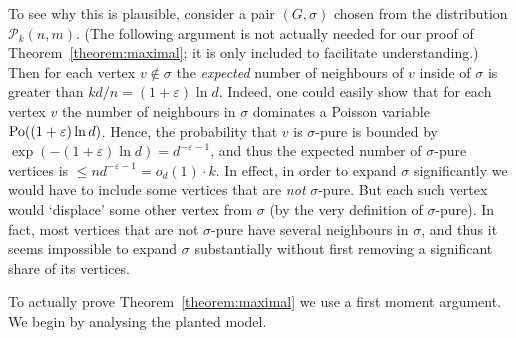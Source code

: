 \documentclass[a4paper,10pt]{article}
\newcommand\cP{\mathcal{P}}
\newcommand\eps{\varepsilon}
\newcommand{\Po}{{\rm Po}}
\newcommand\Thm{Theorem}
\begin{document}
To see why this is plausible, consider a pair $(G,\sigma)$ chosen from the distribution $\cP_k(n,m)$.
(The following argument is not actually needed for our proof of \Thm~\ref{theorem:maximal}; it is only included
	to facilitate understanding.)
Then for each vertex $v\not\in\sigma$ the \emph{expected} number of neighbours of $v$
inside of $\sigma$ is greater than $kd/n=(1+\eps)\ln d$.
Indeed, one could easily show that for each vertex $v$ the number of neighbours in $\sigma$
dominates a Poisson variable $\Po((1+\eps)\ln d)$.
Hence, the probability that $v$ is $\sigma$-pure is bounded by
	$\exp(-(1+\eps)\ln d)=d^{-\eps-1}$,
and thus the expected number of $\sigma$-pure vertices is $\leq n d^{-\eps-1}= o_d(1)\cdot k$.
In effect, in order to expand $\sigma$ significantly we would have to include some
vertices that are \emph{not} $\sigma$-pure.
But each such vertex would `displace' some other vertex from $\sigma$
	(by the very definition of $\sigma$-pure).
In fact, most vertices that are not $\sigma$-pure have several neighbours in $\sigma$,
and thus it seems impossible to expand $\sigma$ substantially without first removing
a significant share of its vertices.

To actually prove \Thm~\ref{theorem:maximal} we use a first moment argument.
We begin by analysing the planted model.
\end{document}
